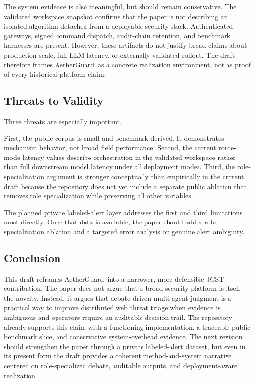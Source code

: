 \documentclass[pdflatex,sn-mathphys-num]{sn-jnl}
\newcommand{\system}{AetherGuard}
\begin{document}
The system evidence is also meaningful, but should remain conservative. The validated workspace snapshot confirms that the paper is not describing an isolated algorithm detached from a deployable security stack. Authenticated gateways, signed command dispatch, audit-chain retention, and benchmark harnesses are present. However, these artifacts do not justify broad claims about production scale, full LLM latency, or externally validated rollout. The draft therefore frames \system\ as a concrete realization environment, not as proof of every historical platform claim.

\subsection{Threats to Validity}

Three threats are especially important.

First, the public corpus is small and benchmark-derived. It demonstrates mechanism behavior, not broad field performance. Second, the current route-mode latency values describe orchestration in the validated workspace rather than full downstream model latency under all deployment modes. Third, the role-specialization argument is stronger conceptually than empirically in the current draft because the repository does not yet include a separate public ablation that removes role specialization while preserving all other variables.

The planned private labeled-alert layer addresses the first and third limitations most directly. Once that data is available, the paper should add a role-specialization ablation and a targeted error analysis on genuine alert ambiguity.

\subsection{Conclusion}

This draft reframes \system\ into a narrower, more defensible JCST contribution. The paper does not argue that a broad security platform is itself the novelty. Instead, it argues that debate-driven multi-agent judgment is a practical way to improve distributed web threat triage when evidence is ambiguous and operators require an auditable decision trail. The repository already supports this claim with a functioning implementation, a traceable public benchmark slice, and conservative system-overhead evidence. The next revision should strengthen the paper through a private labeled-alert dataset, but even in its present form the draft provides a coherent method-and-system narrative centered on role-specialized debate, auditable outputs, and deployment-aware realization.
\end{document}
